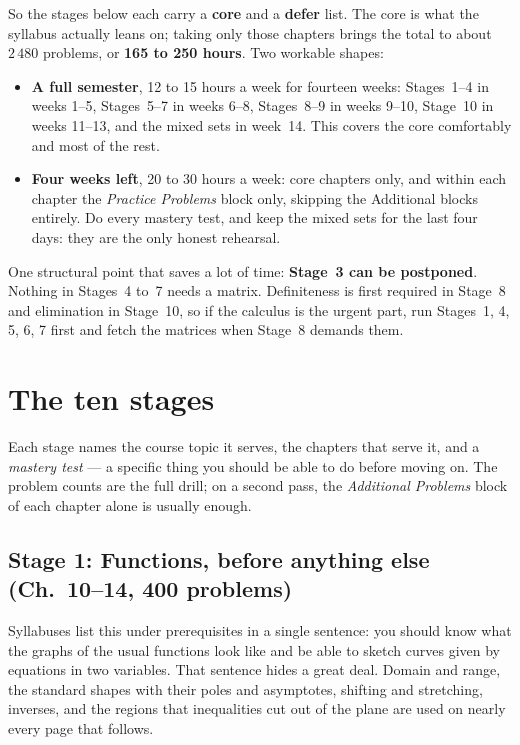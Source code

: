So the stages below each carry a \textbf{core} and a \textbf{defer} list.
The core is what the syllabus actually leans on; taking only those chapters
brings the total to about $2\,480$ problems, or \textbf{165 to 250 hours}.
Two workable shapes:

\begin{itemize}[leftmargin=1.6em,itemsep=0.3ex]
  \item \textbf{A full semester}, 12 to 15 hours a week for fourteen weeks:
        Stages~1--4 in weeks 1--5, Stages~5--7 in weeks 6--8, Stages~8--9 in
        weeks 9--10, Stage~10 in weeks 11--13, and the mixed sets in
        week~14. This covers the core comfortably and most of the rest.
  \item \textbf{Four weeks left}, 20 to 30 hours a week: core chapters only,
        and within each chapter the \emph{Practice Problems} block only,
        skipping the Additional blocks entirely. Do every mastery test, and
        keep the mixed sets for the last four days: they are the only
        honest rehearsal.
\end{itemize}

One structural point that saves a lot of time: \textbf{Stage~3 can be
postponed}. Nothing in Stages~4 to~7 needs a matrix. Definiteness is first
required in Stage~8 and elimination in Stage~10, so if the calculus is the
urgent part, run Stages~1, 4, 5, 6, 7 first and fetch the matrices when
Stage~8 demands them.

\section*{The ten stages}

Each stage names the course topic it serves, the chapters that serve it, and
a \emph{mastery test} --- a specific thing you should be able to do before
moving on. The problem counts are the full drill; on a second pass, the
\emph{Additional Problems} block of each chapter alone is usually enough.

\subsection*{Stage 1: Functions, before anything else (Ch.~10--14, 400 problems)}

Syllabuses list this under prerequisites in a single sentence: you should
know what the graphs of the usual functions look like and be able to sketch
curves given by equations in two variables. That sentence hides a great deal.
Domain and range, the standard shapes with their poles and asymptotes,
shifting and stretching, inverses, and the regions that inequalities cut out
of the plane are used on nearly every page that follows.

